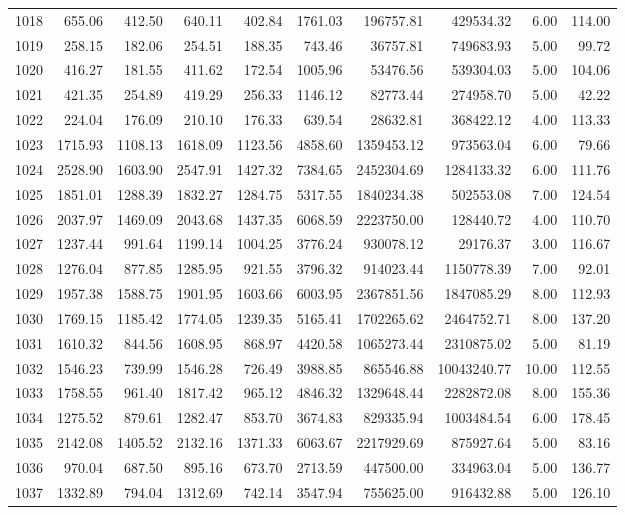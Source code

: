 \begin{tabular}{lrrrrrrrrr}
1018 & 655.06 & 412.50 & 640.11 & 402.84 & 1761.03 & 196757.81 & 429534.32 & 6.00 & 114.00 \\
1019 & 258.15 & 182.06 & 254.51 & 188.35 & 743.46 & 36757.81 & 749683.93 & 5.00 & 99.72 \\
1020 & 416.27 & 181.55 & 411.62 & 172.54 & 1005.96 & 53476.56 & 539304.03 & 5.00 & 104.06 \\
1021 & 421.35 & 254.89 & 419.29 & 256.33 & 1146.12 & 82773.44 & 274958.70 & 5.00 & 42.22 \\
1022 & 224.04 & 176.09 & 210.10 & 176.33 & 639.54 & 28632.81 & 368422.12 & 4.00 & 113.33 \\
1023 & 1715.93 & 1108.13 & 1618.09 & 1123.56 & 4858.60 & 1359453.12 & 973563.04 & 6.00 & 79.66 \\
1024 & 2528.90 & 1603.90 & 2547.91 & 1427.32 & 7384.65 & 2452304.69 & 1284133.32 & 6.00 & 111.76 \\
1025 & 1851.01 & 1288.39 & 1832.27 & 1284.75 & 5317.55 & 1840234.38 & 502553.08 & 7.00 & 124.54 \\
1026 & 2037.97 & 1469.09 & 2043.68 & 1437.35 & 6068.59 & 2223750.00 & 128440.72 & 4.00 & 110.70 \\
1027 & 1237.44 & 991.64 & 1199.14 & 1004.25 & 3776.24 & 930078.12 & 29176.37 & 3.00 & 116.67 \\
1028 & 1276.04 & 877.85 & 1285.95 & 921.55 & 3796.32 & 914023.44 & 1150778.39 & 7.00 & 92.01 \\
1029 & 1957.38 & 1588.75 & 1901.95 & 1603.66 & 6003.95 & 2367851.56 & 1847085.29 & 8.00 & 112.93 \\
1030 & 1769.15 & 1185.42 & 1774.05 & 1239.35 & 5165.41 & 1702265.62 & 2464752.71 & 8.00 & 137.20 \\
1031 & 1610.32 & 844.56 & 1608.95 & 868.97 & 4420.58 & 1065273.44 & 2310875.02 & 5.00 & 81.19 \\
1032 & 1546.23 & 739.99 & 1546.28 & 726.49 & 3988.85 & 865546.88 & 10043240.77 & 10.00 & 112.55 \\
1033 & 1758.55 & 961.40 & 1817.42 & 965.12 & 4846.32 & 1329648.44 & 2282872.08 & 8.00 & 155.36 \\
1034 & 1275.52 & 879.61 & 1282.47 & 853.70 & 3674.83 & 829335.94 & 1003484.54 & 6.00 & 178.45 \\
1035 & 2142.08 & 1405.52 & 2132.16 & 1371.33 & 6063.67 & 2217929.69 & 875927.64 & 5.00 & 83.16 \\
1036 & 970.04 & 687.50 & 895.16 & 673.70 & 2713.59 & 447500.00 & 334963.04 & 5.00 & 136.77 \\
1037 & 1332.89 & 794.04 & 1312.69 & 742.14 & 3547.94 & 755625.00 & 916432.88 & 5.00 & 126.10 \\

\end{tabular}

